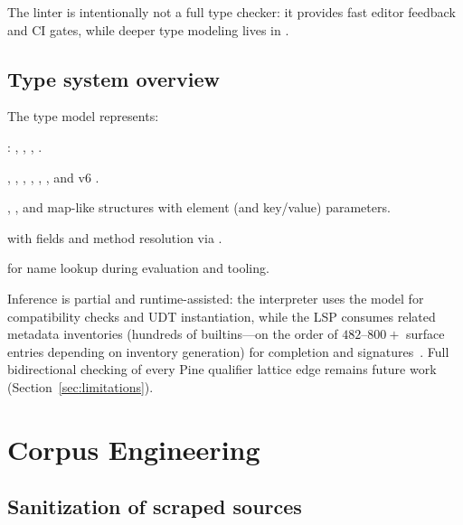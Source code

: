 \documentclass[11pt,a4paper]{article}
\begin{document}
The linter is intentionally not a full type checker: it provides fast editor
feedback and CI gates, while deeper type modeling lives in
.

\subsection{Type system overview}
\label{sec:types}

The type model represents:

\begin{description}[style=nextline,leftmargin=1.2em]
  \item[Qualifiers]
    : , , ,
    .
  \item[Builtin scalars]
    , , , , ,
    , and v6 .
  \item[Collections]
    , , and map-like structures with element
    (and key/value) parameters.
  \item[UDTs]
     with fields and method resolution via
    .
  \item[Registry]
     for name lookup during evaluation and tooling.
\end{description}

Inference is partial and runtime-assisted: the interpreter uses the model for
compatibility checks and UDT instantiation, while the LSP consumes related
metadata inventories (hundreds of builtins---on the order of \(482\)--\(800+\)
surface entries depending on inventory generation) for completion and
signatures~\citep{pynescript2026}. Full bidirectional checking of every Pine
qualifier lattice edge remains future work (Section~\ref{sec:limitations}).

\section{Corpus Engineering}
\label{sec:corpus}

\subsection{Sanitization of scraped sources}
\label{sec:sanitize}
\end{document}
